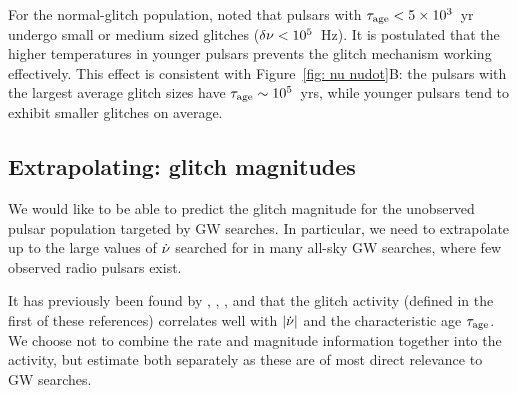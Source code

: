 \documentclass[../full_thesis/full_thesis.tex]{subfiles}
\begin{document}

For the normal-glitch population, \citet{Espinoza2011} noted that pulsars with
$\tau_{\mathrm{age}} < 5\times10^{3} $~yr undergo small or medium sized glitches
($\delta\nu < 10^{5}$~Hz).  It is postulated that the higher temperatures in
younger pulsars prevents the glitch mechanism working effectively. This effect
is consistent with Figure~\ref{fig: nu nudot}B: the pulsars with the largest
average glitch sizes have $\tau_{\mathrm{age}} \sim 10^{5}$~yrs, while younger pulsars tend
to exhibit smaller glitches on average.

\subsection{Extrapolating: glitch magnitudes}

We would like to be able to predict the glitch magnitude for the unobserved
pulsar population targeted by GW searches. In particular, we need to
extrapolate up to the large values of $\dot{\nu}$ searched for in many all-sky
GW searches, where few observed radio pulsars exist.

It has previously been found by \citet{Mckenna1990}, \citet{Lyne2000},
\citet{Wang2000}, and \citet{Espinoza2011}
that the glitch activity (defined in the first of these references) correlates
well with $|\dot{\nu}|$ and the characteristic age
$\tau_{\mathrm{age}}$. We choose not to combine the rate and
magnitude information together into the activity, but estimate both separately
as these are of most direct relevance to GW searches.
\end{document}

